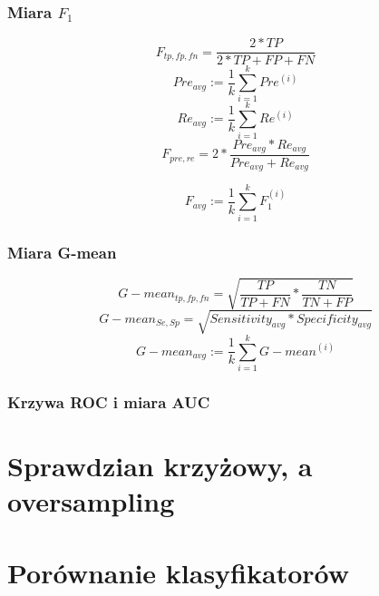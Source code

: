 \subsubsection{Miara $F_1$}

\[F_{tp, fp, fn} = \frac{2*TP}{2*TP+FP+FN} \]
\[Pre_{avg} := \frac{1}{k} \sum_{i=1}^{k} Pre^{(i)}\]
\[Re_{avg} := \frac{1}{k} \sum_{i=1}^{k} Re^{(i)}\]
\[F_{pre, re} = 2 * \frac{Pre_{avg}*Re_{avg}}{Pre_{avg}+Re_{avg}} \]

\[F_{avg} := \frac{1}{k} \sum_{i=1}^{k} F_1^{(i)}\]

\subsubsection{Miara G-mean}
\[G-mean_{tp, fp, fn} = \sqrt{\frac{TP}{TP + FN}*\frac{TN}{TN + FP}} \]
\[G-mean_{Se, Sp} = \sqrt{Sensitivity_{avg}*Specificity_{avg}} \]
\[G-mean_{avg} := \frac{1}{k} \sum_{i=1}^{k} G-mean^{(i)} \]
\subsubsection{Krzywa ROC i miara AUC}
\section{Sprawdzian krzyżowy, a oversampling}

\section{Porównanie klasyfikatorów}

